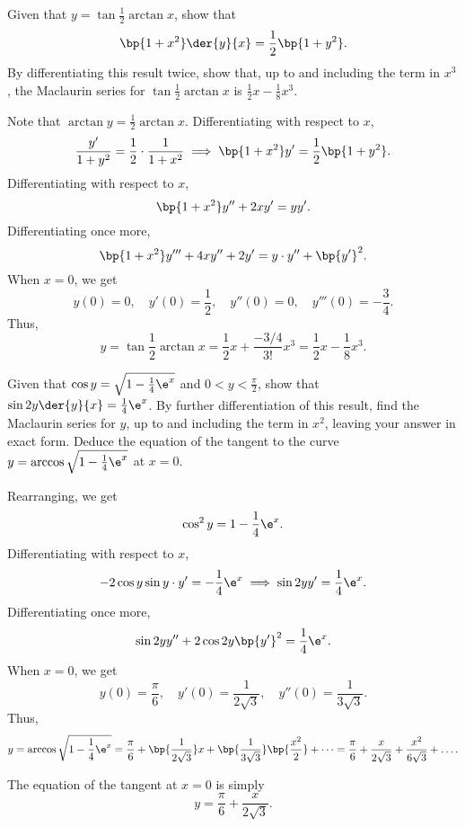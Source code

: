 \begin{problem}
    Given that $y=\tan{\frac12 \arctan x}$, show that \[\bp{1 + x^2} \der{y}{x} = \frac12 \bp{1 + y^2}.\] By differentiating this result twice, show that, up to and including the term in $x^{3}$, the Maclaurin series for $\tan{\frac12 \arctan x}$ is $\frac12x - \frac18 x^3$.
\end{problem}
\begin{solution}
    Note that $\arctan y = \frac12 \arctan x$. Differentiating with respect to $x$, \[\frac{y'}{1 + y^2} = \frac12 \cdot \frac{1}{1 + x^2} \implies \bp{1 + x^2} y' = \frac12 \bp{1 + y^2}.\] Differentiating with respect to $x$, \[\bp{1 + x^2} y'' + 2xy' = y y'.\] Differentiating once more, \[\bp{1 + x^2} y''' + 4xy'' + 2y' = y \cdot y'' + \bp{y'}^2.\] When $x = 0$, we get \[y(0) = 0, \quad y'(0) = \frac12, \quad y''(0) = 0, \quad y'''(0) = -\frac34.\] Thus, \[y = \tan{\frac12 \arctan x} = \frac12 x + \frac{-3/4}{3!} x^3 = \frac12 x - \frac18 x^3.\]
\end{solution}

\begin{problem}
    Given that $\cos y=\sqrt{1-\frac{1}{4} \e^x}$ and $0<y<\frac{\pi}{2}$, show that $\sin{2y}\der{y}{x} = \frac14 \e^x$. By further differentiation of this result, find the Maclaurin series for $y$, up to and including the term in $x^{2}$, leaving your answer in exact form. Deduce the equation of the tangent to the curve $y=\arccos \sqrt{1-\frac{1}{4} \e^x}$ at $x=0$.
\end{problem}
\begin{solution}
    Rearranging, we get \[\cos^2 y = 1 - \frac14 \e^x.\] Differentiating with respect to $x$, \[-2\cos y \sin y \cdot y' = -\frac14 \e^x \implies \sin{2y} y' = \frac14 \e^x.\] Differentiating once more, \[\sin{2y} y'' + 2 \cos{2y} \bp{y'}^2 = \frac14 \e^x.\] When $x = 0$, we get \[y(0) = \frac\pi6, \quad y'(0) = \frac1{2\sqrt3}, \quad y''(0) = \frac1{3\sqrt3}.\] Thus, \[y = \arccos \sqrt{1-\frac{1}{4} \e^x} = \frac\pi6 + \bp{\frac1{2\sqrt3}} x + \bp{\frac{1}{3\sqrt3}} \bp{\frac{x^2}{2}} + \dots = \frac\pi6 + \frac{x}{2\sqrt3} + \frac{x^2}{6\sqrt3} + \dots.\]

    The equation of the tangent at $x = 0$ is simply \[y = \frac\pi6 + \frac{x}{2\sqrt3}.\]
\end{solution}

